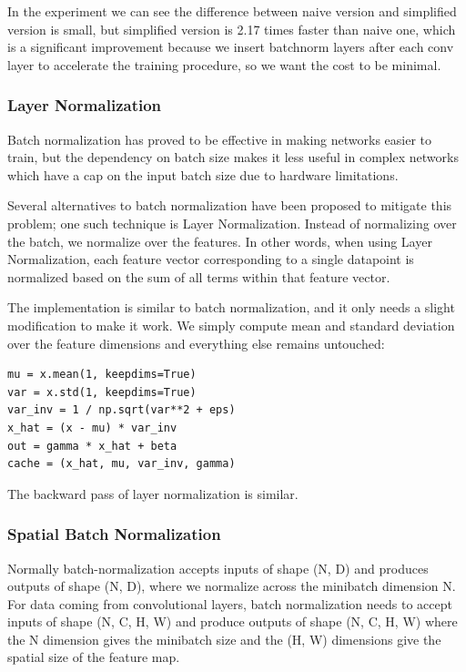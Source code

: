 \documentclass{article} %
\begin{document}
In the experiment we can see the difference between naive version and simplified version is small, but simplified version is 2.17 times faster than naive one, which is a significant improvement because we insert batchnorm layers after each conv layer to accelerate the training procedure, so we want the cost to be minimal.

\subsubsection{Layer Normalization}
Batch normalization has proved to be effective in making networks easier to train, but the dependency on batch size makes it less useful in complex networks which have a cap on the input batch size due to hardware limitations.

Several alternatives to batch normalization have been proposed to mitigate this problem; one such technique is Layer Normalization. Instead of normalizing over the batch, we normalize over the features. In other words, when using Layer Normalization, each feature vector corresponding to a single datapoint is normalized based on the sum of all terms within that feature vector.

The implementation is similar to batch normalization, and it only needs a slight modification to make it work. We simply compute mean and standard deviation over the feature dimensions and everything else remains untouched:
\begin{lstlisting}
mu = x.mean(1, keepdims=True)
var = x.std(1, keepdims=True)
var_inv = 1 / np.sqrt(var**2 + eps)
x_hat = (x - mu) * var_inv
out = gamma * x_hat + beta
cache = (x_hat, mu, var_inv, gamma)
\end{lstlisting}

The backward pass of layer normalization is similar.

\subsubsection{Spatial Batch Normalization}
Normally batch-normalization accepts inputs of shape (N, D) and produces outputs of shape (N, D), where we normalize across the minibatch dimension N. For data coming from convolutional layers, batch normalization needs to accept inputs of shape (N, C, H, W) and produce outputs of shape (N, C, H, W) where the N dimension gives the minibatch size and the (H, W) dimensions give the spatial size of the feature map.
\end{document}
